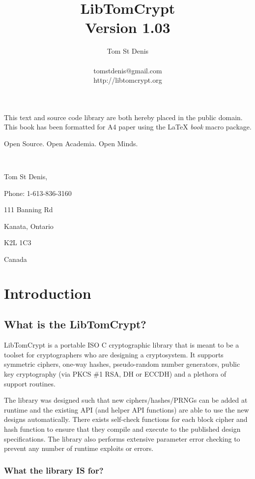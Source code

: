\documentclass[a4paper]{book}
\begin{document}
\title{LibTomCrypt \\ Version 1.03}
\author{Tom St Denis \\
\\
tomstdenis@gmail.com \\
http://libtomcrypt.org
}
\maketitle
This text and source code library are both hereby placed in the public domain.  This book has been 
formatted for A4 paper using the \LaTeX{} {\em book} macro package.

\vspace{15cm}

\begin{flushright}Open Source.  Open Academia.  Open Minds.

\mbox{ }

Tom St Denis,

Phone: 1-613-836-3160

111 Banning Rd 

Kanata, Ontario 

K2L 1C3 

Canada
\end{flushright}
\newpage
\tableofcontents
\chapter{Introduction}
\section{What is the LibTomCrypt?}
LibTomCrypt is a portable ISO C cryptographic library that is meant to be a toolset for cryptographers who are 
designing a cryptosystem.  It supports symmetric ciphers, one-way hashes, pseudo-random number generators, 
public key cryptography (via PKCS \#1 RSA, DH or ECCDH) and a plethora of support 
routines.  

The library was designed such that new ciphers/hashes/PRNGs can be added at runtime and the existing API 
(and helper API functions) are able to use the new designs automatically.  There exists self-check functions for each 
block cipher and hash function to ensure that they compile and execute to the published design specifications.  The library 
also performs extensive parameter error checking to prevent any number of runtime exploits or errors.

\subsection{What the library IS for?}
\end{document}
